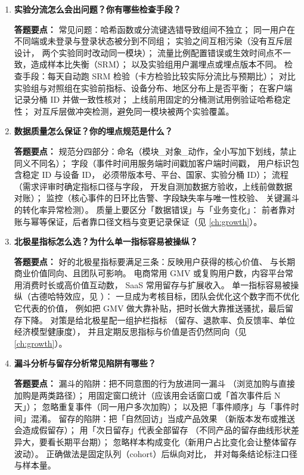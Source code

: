 \begin{interview}[题库与答题要点]
\begin{enumerate}[label=]
  \item[\textcolor{VioletDeep}{\textbf{Q126.}}] \textbf{实验分流怎么会出问题？你有哪些检查手段？}
\par\smallskip\noindent\textcolor{VioletDeep}{\textbf{答题要点：}}
常见问题：哈希函数或分流键选错导致组间不独立；
同一用户在不同端或未登录与登录状态被分到不同组；
实验之间互相污染（没有互斥层设计，
两个实验同时改动同一模块）；
流量比例配置错误或生效时间点不一致，造成样本比失衡（SRM）；
以及实验组用户漏埋点或埋点版本不同。
检查手段：每天自动跑 SRM 检验（卡方检验比较实际分流比与预期比）；
对比实验组与对照组在实验前指标、设备分布、地区分布上是否平衡；
在客户端记录分桶 ID 并做一致性核对；
上线前用固定的分桶测试用例验证哈希稳定性；
对互斥层做冲突检测，避免同一模块被两个实验覆盖。

  \item[\textcolor{VioletDeep}{\textbf{Q127.}}] \textbf{数据质量怎么保证？你的埋点规范是什么？}
\par\smallskip\noindent\textcolor{VioletDeep}{\textbf{答题要点：}}
规范分四部分：命名（模块\_对象\_动作，全小写加下划线，禁止同义不同名）；
字段（事件时间用服务端时间戳加客户端时间戳，
用户标识包含稳定 ID 与设备 ID，
必须带版本号、平台、国家、实验分桶 ID）；
流程（需求评审时确定指标口径与字段，
开发自测加数据方验收，上线前做数据对账）；
监控（核心事件的日环比告警、字段缺失率与唯一性校验、
关键漏斗的转化率异常检测）。
质量上要区分「数据错误」与「业务变化」：
前者靠对账与幂等保证，后者靠口径文档与变更记录保证（见 \cref{ch:growth}）。

  \item[\textcolor{VioletDeep}{\textbf{Q128.}}] \textbf{北极星指标怎么选？为什么单一指标容易被操纵？}
\par\smallskip\noindent\textcolor{VioletDeep}{\textbf{答题要点：}}
好的北极星指标要满足三条：反映用户获得的核心价值、
与长期商业价值同向、且团队可影响。
电商常用 GMV 或复购用户数，内容平台常用消费时长或高价值互动数，
SaaS 常用留存与扩展收入。
单一指标容易被操纵（古德哈特效应，见 \cite{goodhart1975}）：
一旦成为考核目标，团队会优化这个数字而不优化它代表的价值，
例如把 GMV 做大靠补贴，把时长做大靠推送骚扰，最后留存下降。
对策是给北极星配一组护栏指标
（留存、退款率、负反馈率、单位经济模型健康度），
并且定期反思指标与价值是否仍然同向（见 \cref{ch:growth}）。

  \item[\textcolor{VioletDeep}{\textbf{Q129.}}] \textbf{漏斗分析与留存分析常见陷阱有哪些？}
\par\smallskip\noindent\textcolor{VioletDeep}{\textbf{答题要点：}}
漏斗的陷阱：把不同意图的行为放进同一漏斗
（浏览加购与直接加购是两类路径）；
用固定窗口统计（应该用会话窗口或「首次事件后 N 天」）；
忽略重复事件（同一用户多次加购）；
以及把「事件顺序」与「事件时间」混淆。
留存的陷阱：把「自然回访」当成产品效果
（新版本发布或推送会造成假留存）；
用「次日留存」代表全部留存
（不同产品的留存曲线形状差异大，要看长期平台期）；
忽略样本构成变化（新用户占比变化会让整体留存波动）。
正确做法是固定队列（cohort）后纵向对比，
并对每条结论标注口径与样本量。


\end{enumerate}
\end{interview}
